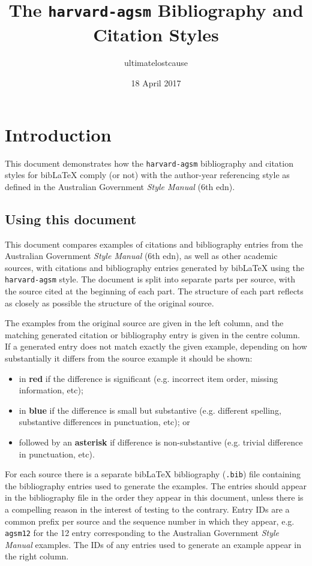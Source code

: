 \documentclass[a4paper,landscape,12pt]{article}
\title{The \texttt{harvard-agsm} Bibliography and Citation Styles}
\date{18 April 2017}
\author{ultimatelostcause}
\newlength\q
\begin{document}
\twocolumn[\maketitle]
\tableofcontents
\clearpage

\section{Introduction}

This document demonstrates how the \texttt{harvard-agsm} bibliography and citation styles for bib\LaTeX{} comply (or not) with the author-year referencing style as defined in the Australian Government \textit{Style Manual} (6th edn).

\subsection{Using this document}

This document compares examples of citations and bibliography entries from the Australian Government \textit{Style Manual} (6th edn), as well as other academic sources, with citations and bibliography entries generated by bib\LaTeX{} using the \texttt{harvard-agsm} style.  The document is split into separate parts per source, with the source cited at the beginning of each part.  The structure of each part reflects as closely as possible the structure of the original source.

The examples from the original source are given in the left column, and the matching generated citation or bibliography entry is given in the centre column.  If a generated entry does not match exactly the given example, depending on how substantially it differs from the source example it should be shown:

\begin{itemize}
	\item in \textbf{red} if the difference is significant (e.g. incorrect item order, missing information, etc);
	\item in \textbf{blue} if the difference is small but substantive (e.g. different spelling, substantive differences in punctuation, etc); or
	\item followed by an \textbf{asterisk} if difference is non-substantive (e.g. trivial difference in punctuation, etc).
\end{itemize}

For each source there is a separate bib\LaTeX{} bibliography (\texttt{.bib}) file containing the bibliography entries used to generate the examples.  The entries should appear in the bibliography file in the order they appear in this document, unless there is a compelling reason in the interest of testing to the contrary.  Entry IDs are a common prefix per source and the sequence number in which they appear, e.g. \texttt{agsm12} for the 12 entry corresponding to the Australian Government \textit{Style Manual} examples.  The IDs of any entries used to generate an example appear in the right column.
\end{document}
